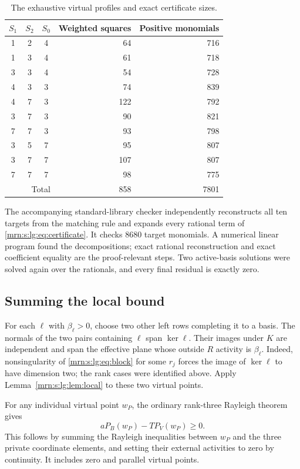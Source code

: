\documentclass[11pt,a4paper]{article}
\theoremstyle{remark}\newtheorem{remark}[theorem]{Remark}
\begin{document}
\begin{table}[ht]
\centering
\caption{The exhaustive virtual profiles and exact certificate sizes.}\label{mrn:s:lg:tab:profiles}
\begin{tabular}{ccc rr}
\toprule
$S_1$&$S_2$&$S_0$&Weighted squares&Positive monomials\\
\midrule
1&2&4&64&716\\
1&3&4&61&718\\
3&3&4&54&728\\
4&3&3&74&839\\
4&7&3&122&792\\
3&7&3&90&821\\
7&7&3&93&798\\
3&5&7&95&807\\
3&7&7&107&807\\
7&7&7&98&775\\
\midrule
\multicolumn{3}{r}{Total}&858&7801\\
\bottomrule
\end{tabular}
\end{table}

The accompanying standard-library checker independently reconstructs all ten targets from the matching rule and expands every rational term of \eqref{mrn:s:lg:eq:certificate}. It checks 8680 target monomials. A numerical linear program found the decompositions; exact rational reconstruction and exact coefficient equality are the proof-relevant steps. Two active-basis solutions were solved again over the rationals, and every final residual is exactly zero.

\subsection{Summing the local bound}
For each $\ell$ with $\beta_\ell>0$, choose two other left rows completing it to a basis. The normals of the two pairs containing $\ell$ span $\ker\ell$. Their images under $K$ are independent and span the effective plane whose outside $R$ activity is $\beta_\ell$. Indeed, nonsingularity of \eqref{mrn:s:lg:eq:block} for some $r_j$ forces the image of $\ker\ell$ to have dimension two; the rank cases were identified above. Apply Lemma~\ref{mrn:s:lg:lem:local} to these two virtual points.

For any individual virtual point $w_P$, the ordinary rank-three Rayleigh theorem gives
\[
 aP_B(w_P)-TP_V(w_P)\ge0.
\]
This follows by summing the Rayleigh inequalities between $w_P$ and the three private coordinate elements, and setting their external activities to zero by continuity. It includes zero and parallel virtual points.
\end{document}
